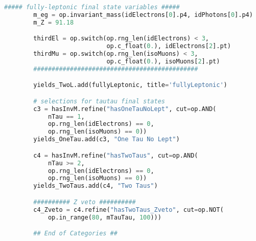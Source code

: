 \begin{lstlisting}[language=Python, caption=Python module of the analysis used in Bamboo framework, label={bamboocode}]
        ##### fully-leptonic final state variables #####
        m_eg = op.invariant_mass(idElectrons[0].p4, idPhotons[0].p4)
        m_Z = 91.18

        thirdEl = op.switch(op.rng_len(idElectrons) < 3,
                            op.c_float(0.), idElectrons[2].pt)
        thirdMu = op.switch(op.rng_len(isoMuons) < 3,
                            op.c_float(0.), isoMuons[2].pt)
        #############################################

        yields_TwoL.add(fullyLeptonic, title='fullyLeptonic')

        # selections for tautau final states
        c3 = hasInvM.refine("hasOneTauNoLept", cut=op.AND(
            nTau == 1,
            op.rng_len(idElectrons) == 0,
            op.rng_len(isoMuons) == 0))
        yields_OneTau.add(c3, "One Tau No Lept")

        c4 = hasInvM.refine("hasTwoTaus", cut=op.AND(
            nTau >= 2,
            op.rng_len(idElectrons) == 0,
            op.rng_len(isoMuons) == 0))
        yields_TwoTaus.add(c4, "Two Taus")

        ########## Z veto ##########
        c4_Zveto = c4.refine("hasTwoTaus_Zveto", cut=op.NOT(
            op.in_range(80, mTauTau, 100)))

        ## End of Categories ##


\end{lstlisting}
